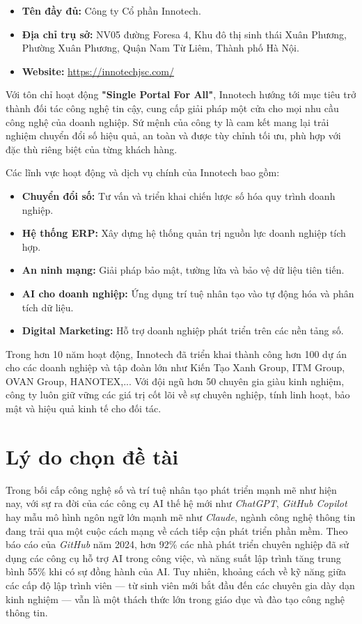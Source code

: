 \documentclass[13pt,a4paper,oneside]{extreport}
\numberwithin{equation}{chapter}
\numberwithin{figure}{chapter}
\numberwithin{table}{chapter}
\begin{document}
\begin{itemize}
    \item \textbf{Tên đầy đủ:} Công ty Cổ phần Innotech.
    \item \textbf{Địa chỉ trụ sở:} NV05 đường Foresa 4, Khu đô thị sinh thái Xuân Phương, Phường Xuân Phương, Quận Nam Từ Liêm, Thành phố Hà Nội.
    \item \textbf{Website:} \url{https://innotechjsc.com/}
\end{itemize}

Với tôn chỉ hoạt động \textbf{"Single Portal For All"}, Innotech hướng tới mục tiêu trở thành đối tác công nghệ tin cậy, cung cấp giải pháp một cửa cho mọi nhu cầu công nghệ của doanh nghiệp. Sứ mệnh của công ty là cam kết mang lại trải nghiệm chuyển đổi số hiệu quả, an toàn và được tùy chỉnh tối ưu, phù hợp với đặc thù riêng biệt của từng khách hàng.

Các lĩnh vực hoạt động và dịch vụ chính của Innotech bao gồm:
\begin{itemize}
    \item \textbf{Chuyển đổi số:} Tư vấn và triển khai chiến lược số hóa quy trình doanh nghiệp.
    \item \textbf{Hệ thống ERP:} Xây dựng hệ thống quản trị nguồn lực doanh nghiệp tích hợp.
    \item \textbf{An ninh mạng:} Giải pháp bảo mật, tường lửa và bảo vệ dữ liệu tiên tiến.
    \item \textbf{AI cho doanh nghiệp:} Ứng dụng trí tuệ nhân tạo vào tự động hóa và phân tích dữ liệu.
    \item \textbf{Digital Marketing:} Hỗ trợ doanh nghiệp phát triển trên các nền tảng số.
\end{itemize}

Trong hơn 10 năm hoạt động, Innotech đã triển khai thành công hơn 100 dự án cho các doanh nghiệp và tập đoàn lớn như Kiến Tạo Xanh Group, ITM Group, OVAN Group, HANOTEX,... Với đội ngũ hơn 50 chuyên gia giàu kinh nghiệm, công ty luôn giữ vững các giá trị cốt lõi về sự chuyên nghiệp, tính linh hoạt, bảo mật và hiệu quả kinh tế cho đối tác.

\section*{Lý do chọn đề tài}

Trong bối cấp công nghệ số và trí tuệ nhân tạo phát triển mạnh mẽ như hiện nay, với sự ra đời của các công cụ AI thế hệ mới như \textit{ChatGPT}, \textit{GitHub Copilot} hay mẫu mô hình ngôn ngữ lớn mạnh mẽ như \textit{Claude}, ngành công nghệ thông tin đang trải qua một cuộc cách mạng về cách tiếp cận phát triển phần mềm. Theo báo cáo của \textit{GitHub} năm 2024, hơn 92\% các nhà phát triển chuyên nghiệp đã sử dụng các công cụ hỗ trợ AI trong công việc, và năng suất lập trình tăng trung bình 55\% khi có sự đồng hành của AI. Tuy nhiên, khoảng cách về kỹ năng giữa các cấp độ lập trình viên — từ sinh viên mới bắt đầu đến các chuyên gia dày dạn kinh nghiệm — vẫn là một thách thức lớn trong giáo dục và đào tạo công nghệ thông tin.
\end{document}
